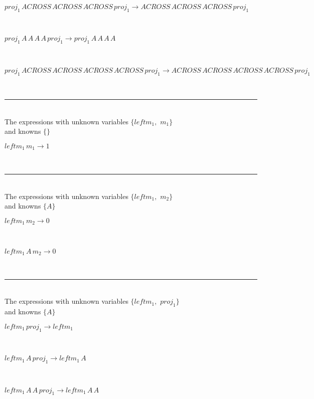 \begin{minipage}{6in}
$
proj_{1}\,
 ACROSS\,
 ACROSS\,
 ACROSS\,
 proj_{1}\rightarrow ACROSS\,
 ACROSS\,
 ACROSS\,
 proj_{1}
$
\end{minipage}\medskip \\
\begin{minipage}{6in}
$
proj_{1}\,
 A\,
 A\,
 A\,
 A\,
 proj_{1}\rightarrow proj_{1}\,
 A\,
 A\,
 A\,
 A
$
\end{minipage}\medskip \\
\begin{minipage}{6in}
$
proj_{1}\,
 ACROSS\,
 ACROSS\,
 ACROSS\,
 ACROSS\,
 proj_{1}\rightarrow ACROSS\,
 ACROSS\,
 ACROSS\,
 ACROSS\,
 proj_{1}
$
\end{minipage}\\
\rule[3pt]{6in}{.7pt}\\
The expressions with unknown variables $\{leftm_{1},
$ $
m_{1}\}$\\
and knowns $\{\}$\smallskip\\
\begin{minipage}{6in}
$
leftm_{1}\,
 m_{1}\rightarrow 1
$
\end{minipage}\\
\rule[3pt]{6in}{.7pt}\\
The expressions with unknown variables $\{leftm_{1},
$ $
m_{2}\}$\\
and knowns $\{A\}$\smallskip\\
\begin{minipage}{6in}
$
leftm_{1}\,
 m_{2}\rightarrow 0
$
\end{minipage}\medskip \\
\begin{minipage}{6in}
$
leftm_{1}\,
 A\,
 m_{2}\rightarrow 0
$
\end{minipage}\\
\rule[3pt]{6in}{.7pt}\\
The expressions with unknown variables $\{leftm_{1},
$ $
proj_{1}\}$\\
and knowns $\{A\}$\smallskip\\
\begin{minipage}{6in}
$
leftm_{1}\,
 proj_{1}\rightarrow leftm_{1}
$
\end{minipage}\medskip \\
\begin{minipage}{6in}
$
leftm_{1}\,
 A\,
 proj_{1}\rightarrow leftm_{1}\,
 A
$
\end{minipage}\medskip \\
\begin{minipage}{6in}
$
leftm_{1}\,
 A\,
 A\,
 proj_{1}\rightarrow leftm_{1}\,
 A\,
 A
$
\end{minipage}\\

